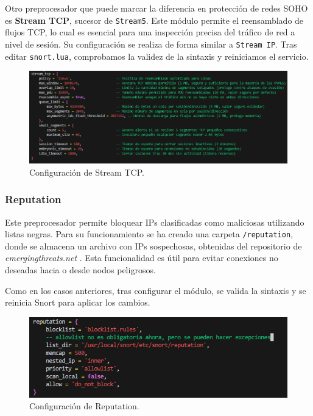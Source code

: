 \documentclass[11pt,a4paper,twoside]{report}
\begin{document}
Otro preprocesador que puede marcar la diferencia en protección de redes SOHO es \textbf{Stream TCP}, sucesor de \texttt{Stream5}. Este módulo permite el reensamblado de flujos TCP, lo cual es esencial para una inspección precisa del tráfico de red a nivel de sesión. Su configuración se realiza de forma similar a \texttt{Stream IP}. Tras editar \texttt{snort.lua}, comprobamos la validez de la sintaxis y reiniciamos el servicio.

\begin{figure}[H]
	\centering
	\includegraphics[scale=0.6]{stream_tcp/1.png}
	\caption{Configuración de Stream TCP.}
\end{figure}

\subsubsection*{Reputation}

Este preprocesador permite bloquear IPs clasificadas como maliciosas utilizando listas negras. Para su funcionamiento se ha creado una carpeta \texttt{/reputation}, donde se almacena un archivo con IPs sospechosas, obtenidas del repositorio de \textit{emergingthreats.net} \cite{emerging_block_ips}.  Esta funcionalidad es útil para evitar conexiones no deseadas hacia o desde nodos peligrosos.\newline

Como en los casos anteriores, tras configurar el módulo, se valida la sintaxis y se reinicia Snort para aplicar los cambios.

\begin{figure}[H]
	\centering
	\includegraphics[scale=0.8]{reputation/1.png}
	\caption{Configuración de Reputation.}
\end{figure}
\end{document}
